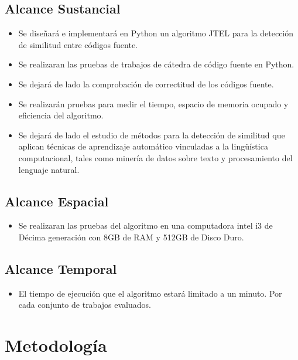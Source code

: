 \subsection{Alcance Sustancial}
\begin{itemize}
    \item Se diseñará e implementará en Python un algoritmo JTEL para la detección de similitud entre códigos fuente.
    \item Se realizaran las pruebas de trabajos de cátedra de código fuente en Python.
    \item Se dejará de lado la comprobación de correctitud de los códigos fuente.
    \item Se realizarán pruebas para medir el tiempo, espacio de memoria ocupado y eficiencia del algoritmo.
    \item Se dejará de lado el estudio de métodos para la detección de similitud que aplican técnicas de aprendizaje automático vinculadas a la lingüística computacional, tales como minería de datos sobre texto y procesamiento del lenguaje natural.
\end{itemize}
\subsection{Alcance Espacial}
\begin{itemize}
    \item Se realizaran las pruebas del algoritmo en una computadora intel i3 de Décima generación con 8GB de RAM y 512GB de Disco Duro.
\end{itemize}
\subsection{Alcance Temporal}
\begin{itemize}
    \item El tiempo de ejecución que el algoritmo estará limitado a un minuto. Por cada conjunto de trabajos evaluados.
\end{itemize}
\section{Metodología}
